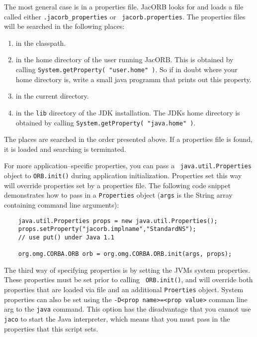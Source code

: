 \documentclass[12pt]{scrbook}
\begin{document}
The most  general case is in  a properties file. JacORB  looks for and
loads  a   file  called  either  {\tt   .jacorb\_properties}  or  {\tt
jacorb.properties}. The properties files will be searched in the
following places:
\begin{enumerate}
  \item in the classpath.
  \item in the home directory of the user running JacORB. This is
        obtained by calling {\tt System.getProperty( "user.home" )}.
        So if in doubt where your home directory is, write a small
        java programm that prints out this property.
  \item in the current directory.
  \item in the {\tt lib} directory of the JDK installation. The JDKs
        home directory is obtained by calling 
        {\tt System.getProperty( "java.home" )}.
\end{enumerate}

The places are searched in the order presented above. If a properties
file is found, it is loaded and searching is terminated. 

For  more  application--specific  properties,  you  can  pass  a  {\tt
  java.util.Properties} object to  {\tt ORB.init()} during application
  initialization. Properties set this way will override properties set
  by a properties file. The following code snippet demonstrates how to
  pass in  a {\tt Properties} object  ({\tt args} is  the String array
  containing command line arguments):

\small{
\begin{verbatim}            
    java.util.Properties props = new java.util.Properties();
    props.setProperty("jacorb.implname","StandardNS"); 
    // use put() under Java 1.1

    org.omg.CORBA.ORB orb = org.omg.CORBA.ORB.init(args, props);
\end{verbatim}
}

The third way  of specifying properties is by  setting the JVMs system
properties.  These  properties  must  be  set prior  to  calling  {\tt
ORB.init()},  and will override  both properties  that are  loaded via
file and  an additional {\tt Proerties} object.  System properties can
also be set using the {\tt -D<prop name>=<prop value>} comman line arg
to the {\tt java} command.   This option has the disadvantage that you
cannot use {\tt jaco} to  start the Java interpreter, which means that
you must pass in the properties that this script sets.
\end{document}
